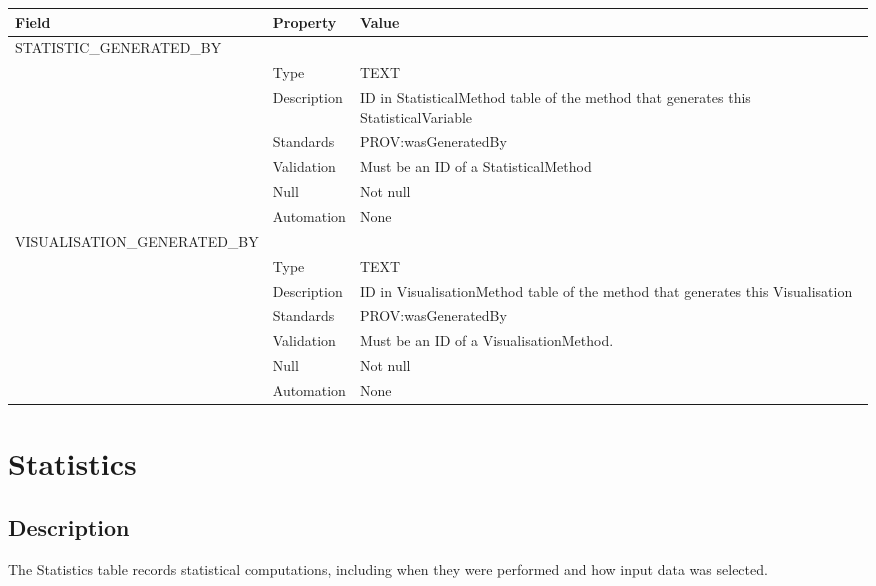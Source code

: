\begin{longtable}[]{@{}
  >{\raggedright\arraybackslash}p{}
  >{\raggedright\arraybackslash}p{}
  >{\raggedright\arraybackslash}p{}@{}}
\toprule\noalign{}
\begin{minipage}[b]{\linewidth}\raggedright
Field
\end{minipage} & \begin{minipage}[b]{\linewidth}\raggedright
Property
\end{minipage} & \begin{minipage}[b]{\linewidth}\raggedright
Value
\end{minipage} \\
\midrule\noalign{}
\endhead
\bottomrule\noalign{}
\endlastfoot
STATISTIC\_GENERATED\_BY & & \\
& Type & TEXT \\
& Description & ID in StatisticalMethod table of the method that
generates this StatisticalVariable \\
& Standards & PROV:wasGeneratedBy \\
& Validation & Must be an ID of a StatisticalMethod \\
& Null & Not null \\
& Automation & None \\
VISUALISATION\_GENERATED\_BY & & \\
& Type & TEXT \\
& Description & ID in VisualisationMethod table of the method that
generates this Visualisation \\
& Standards & PROV:wasGeneratedBy \\
& Validation & Must be an ID of a VisualisationMethod. \\
& Null & Not null \\
& Automation & None \\
\end{longtable}

\section{Statistics}\label{statistics}

\subsection{Description}\label{description-31}

The Statistics table records statistical computations, including when
they were performed and how input data was selected.

